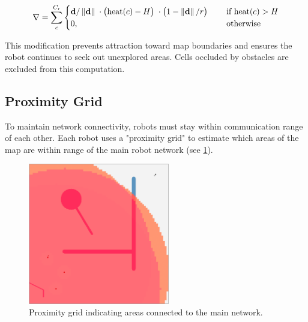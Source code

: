 \begin{equation}
\label{eq:robot-gradient}
    \nabla = \sum_c^{C_\mathrm{r}}
    \begin{cases}
        \mathbf{d}/\left\lVert\mathbf{d}\right\rVert      \; \cdot
        \big(\mathrm{heat}(c) - H\big)    \; \cdot
        \big(1 - \left\lVert\mathbf{d}\right\rVert/r\big) \; \quad &\text{if } \mathrm{heat}(c) > H
        \\
        0, \quad &\text{otherwise}
    \end{cases}
\end{equation}

This modification prevents attraction toward map boundaries and ensures the robot continues to seek out unexplored areas. Cells occluded by obstacles are excluded from this computation.


\subsection{Proximity Grid}
To maintain network connectivity, robots must stay within communication range of each other. Each robot uses a "proximity grid" to estimate which areas of the map are within range of the main robot network (see \cref{fig:proximity-grid}).

\begin{figure}[h]
    \begin{center}
        \includegraphics[width=0.55\textwidth]{figures/screenshots/proximity-gradient.png}
    \end{center}
    \caption{Proximity grid indicating areas connected to the main network.}
    \label{fig:proximity-grid}
\end{figure}

